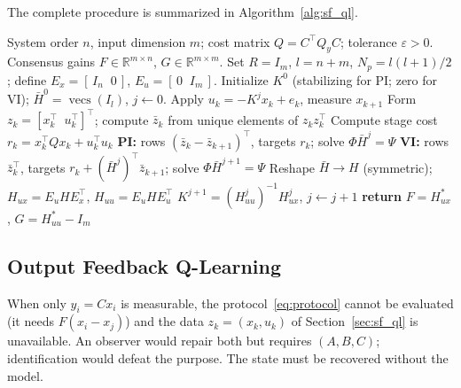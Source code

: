 \documentclass[final,5p,times]{elsarticle}
\theoremstyle{plain}
\theoremstyle{definition}
\theoremstyle{remark}
\DeclareMathOperator{\vecs}{vecs}
\newcommand{\R}{\mathbb{R}}
\begin{document}
The complete procedure is summarized in Algorithm~\ref{alg:sf_ql}.
\begin{algorithm}[!htb]
\caption{State Feedback Q-Learning for Consensus Gains}
\label{alg:sf_ql}
{\footnotesize
\begin{algorithmic}[1]
\REQUIRE System order $n$, input dimension $m$; cost matrix $Q = C^\top Q_y C$; tolerance $\varepsilon > 0$.
\ENSURE Consensus gains $F \in \R^{m \times n}$, $G \in \R^{m \times m}$.
\STATE Set $R = I_m$, $l = n + m$, $N_p = l(l+1)/2$; define $E_x = [\,I_n \;\; 0\,]$, $E_u = [\,0 \;\; I_m\,]$.
\STATE Initialize $K^0$ (stabilizing for PI; zero for VI); $\bar{H}^0 = \vecs(I_l)$, $j \leftarrow 0$.
\REPEAT
        \STATE Apply $u_k = -K^j x_k + e_k$, measure $x_{k+1}$
        \STATE Form $z_k = [x_k^\top \;\; u_k^\top]^\top$; compute $\bar{z}_k$ from unique elements of $z_k z_k^\top$
        \STATE Compute stage cost $r_k = x_k^\top Q x_k + u_k^\top u_k$
    \ENDFOR
    \STATE \textbf{PI:} rows $(\bar{z}_k - \bar{z}_{k+1})^\top$, targets $r_k$; solve $\Phi \bar{H}^j = \Psi$
    \STATE \textbf{VI:} rows $\bar{z}_k^\top$, targets $r_k + (\bar{H}^j)^\top \bar{z}_{k+1}$; solve $\Phi \bar{H}^{j+1} = \Psi$
    \STATE Reshape $\bar{H} \to H$ (symmetric); $H_{ux} = E_u H E_x^\top$, $H_{uu} = E_u H E_u^\top$
    \STATE $K^{j+1} = (H_{uu}^j)^{-1} H_{ux}^j$, \; $j \leftarrow j + 1$
\STATE \textbf{return} $F = H_{ux}^*$, \; $G = H_{uu}^* - I_m$
\end{algorithmic}}
\end{algorithm}
\subsection{Output Feedback Q-Learning}
\label{sec:ofb_ql}
When only $y_i = Cx_i$ is measurable, the protocol~\eqref{eq:protocol} cannot be evaluated (it needs $F(x_i - x_j)$) and the data $z_k = (x_k,u_k)$ of Section~\ref{sec:sf_ql} is unavailable. An observer would repair both but requires $(A,B,C)$; identification would defeat the purpose. The state must be recovered without the model.
\end{document}
